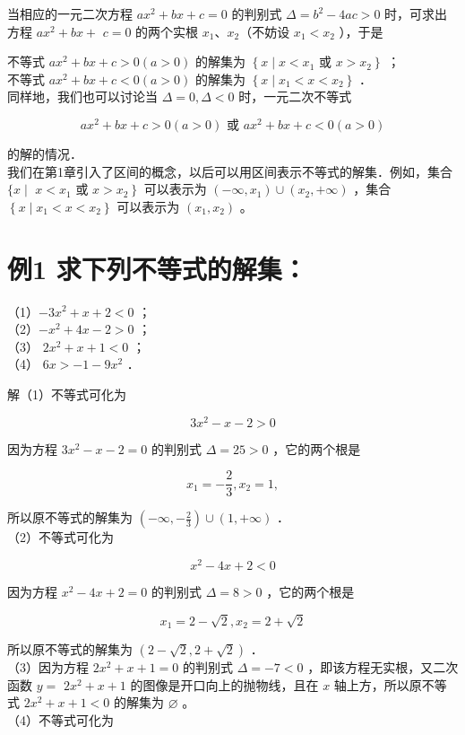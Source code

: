 \documentclass[10pt]{article}
\begin{document}
当相应的一元二次方程 \(a x^{2}+b x+c=0\) 的判别式 \(\Delta=b^{2}-4 a c>0\) 时，可求出方程 \(a x^{2}+b x+\) \(c=0\) 的两个实根 \(x_{1} 、 x_{2}\)（不妨设 \(x_{1}<x_{2}\) ），于是

不等式 \(a x^{2}+b x+c>0(a>0)\) 的解集为 \(\left\{x \mid x<x_{1}\right.\) 或 \(\left.x>x_{2}\right\}\) ；\\
不等式 \(a x^{2}+b x+c<0(a>0)\) 的解集为 \(\left\{x \mid x_{1}<x<x_{2}\right\}\) ．\\
同样地，我们也可以讨论当 \(\Delta=0, \Delta<0\) 时，一元二次不等式

\[
a x^{2}+b x+c>0(a>0) \text { 或 } a x^{2}+b x+c<0(a>0)
\]

的解的情况．\\
我们在第1章引入了区间的概念，以后可以用区间表示不等式的解集．例如，集合 \(\{x \mid\) \(x<x_{1}\) 或 \(\left.x>x_{2}\right\}\) 可以表示为 \(\left(-\infty, x_{1}\right) \cup\left(x_{2},+\infty\right)\) ，集合 \(\left\{x \mid x_{1}<x<x_{2}\right\}\) 可以表示为 \(\left(x_{1}, x_{2}\right)\) 。

\section*{例1 求下列不等式的解集：}
（1）\(-3 x^{2}+x+2<0\) ；\\
（2）\(-x^{2}+4 x-2>0\) ；\\
（3） \(2 x^{2}+x+1<0\) ；\\
（4） \(6 x>-1-9 x^{2}\) ．

解（1）不等式可化为

\[
3 x^{2}-x-2>0
\]

因为方程 \(3 x^{2}-x-2=0\) 的判别式 \(\Delta=25>0\) ，它的两个根是

\[
x_{1}=-\frac{2}{3}, x_{2}=1,
\]

所以原不等式的解集为 \(\left(-\infty,-\frac{2}{3}\right) \cup(1,+\infty)\) ．\\
（2）不等式可化为

\[
x^{2}-4 x+2<0
\]

因为方程 \(x^{2}-4 x+2=0\) 的判别式 \(\Delta=8>0\) ，它的两个根是

\[
x_{1}=2-\sqrt{2}, x_{2}=2+\sqrt{2}
\]

所以原不等式的解集为 \((2-\sqrt{2}, 2+\sqrt{2})\) ．\\
（3）因为方程 \(2 x^{2}+x+1=0\) 的判别式 \(\Delta=-7<0\) ，即该方程无实根，又二次函数 \(y=\) \(2 x^{2}+x+1\) 的图像是开口向上的抛物线，且在 \(x\) 轴上方，所以原不等式 \(2 x^{2}+x+1<0\) 的解集为 \(\varnothing\) 。\\
（4）不等式可化为
\end{document}
